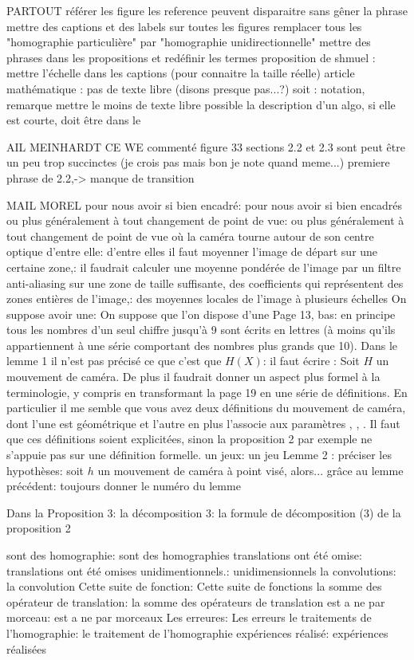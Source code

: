 PARTOUT
	référer les figure
	les reference peuvent disparaitre sans gêner la phrase
	mettre des captions et des labels sur toutes les figures
	remplacer tous les "homographie particulière" par "homographie unidirectionnelle"
	mettre des phrases dans les propositions et redéfinir les termes
	proposition de shmuel : mettre l'échelle dans les captions (pour connaitre la taille réelle)
	article mathématique : pas de texte libre (disons presque pas...?)
		soit : notation, remarque
	mettre le moins de texte libre possible
	la description d'un algo, si elle est courte, doit être dans le \caption


MAIL MEINHARDT CE WE
	commenté figure 33
	sections 2.2 et 2.3 sont peut être un peu trop succinctes (je crois pas mais bon je note quand meme...) 
	premiere phrase de 2.2,-> manque de transition

MAIL MOREL
	pour nous avoir si bien encadré: pour nous avoir si bien encadrés
	ou plus généralement à tout changement
	de point de vue: 
	ou plus généralement à tout changement
	de point de vue où la caméra tourne autour de son centre optique
	d'entre elle: d'entre elles
	il faut moyenner l'image de départ
	sur une certaine zone,: il faudrait calculer une moyenne pondérée de l'image par un filtre anti-aliasing sur une zone de taille suffisante,
	des coefficients qui représentent des zones
	entières de l'image,: des  moyennes locales de l'image à plusieurs échelles
	On suppose avoir une: On suppose que l'on dispose d'une
	Page 13, bas: en  principe tous les nombres d'un seul chiffre jusqu'à 9 sont écrits en lettres (à moins qu'ils appartiennent à une série comportant des nombres plus grands que 10).
	Dans le lemme 1 il n'est pas précisé ce que c'est que $H(X)$: il faut écrire : Soit $H$ un mouvement de caméra.
	De plus il faudrait donner un aspect plus formel à la terminologie, y compris en transformant la page 19 en une série de définitions. En particulier il me semble que vous avez deux définitions du mouvement de caméra, dont l'une est géométrique et l'autre en plus l'associe aux paramètres \theta, \phi, \psi. Il faut que ces définitions soient explicitées, sinon la proposition 2 par exemple ne s'appuie pas sur une définition formelle.
	un jeux: un jeu
	Lemme 2 : préciser les hypothèses: soit $h$ un mouvement  de caméra à point visé, alors...
	grâce au lemme précédent: toujours donner le numéro du lemme
	
	Dans la Proposition 3: la décomposition 3: la formule de décomposition (3) de la proposition 2
	
	sont des homographie: sont des homographies
	translations ont été omise: translations ont été omises
	unidimentionnels.: unidimensionnels
	la convolutions: la convolution
	Cette suite de fonction: Cette suite de fonctions
	la somme des opérateur de translation: la somme des opérateurs de translation
	est a ne par morceau: est a ne par morceaux
	Les erreures: Les erreurs
	le traitements de l'homographie: le traitement de l'homographie
	expériences réalisé: expériences réalisées
